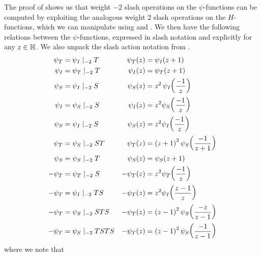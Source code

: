 The proof of  shows us that weight $-2$ slash operations on the $\psi$-functions can be computed by exploiting the analogous weight $2$ slash operations on the $H$-functions, which we can manipulate using  and . We then have the following relations between the $\psi$-functions, expressed in slash notation and explicitly for any $z \in \mathbb{H}$. We also unpack the slash action notation from .
\begin{align}
    \psi_T &= \psi_I \mid_{-2} T &
    \psi_T(z) &= \psi_I\of{z + 1}
    \label{Ch4:Eq:psi_T_eq_psi_I_add_one}
    \\
    \psi_I &= \psi_T \mid_{-2} T &
    \psi_I(z) &= \psi_T\of{z + 1}
    \label{Ch4:Eq:psi_I_eq_psi_T_add_one}
    \\
    \psi_S &= \psi_I \mid_{-2} S &
    \psi_S(z) &= z^2 \, \psi_I\of{\frac{-1}{z}}
    \label{Ch4:Eq:psi_S_eq_zsq_mul_psi_I_neg_inv}
    \\
    \psi_I &= \psi_S \mid_{-2} S &
    \psi_I(z) &= z^2 \psi_S\of{\frac{-1}{z}}
    \label{Ch4:Eq:psi_I_to_psi_S}
    \\
    \psi_S &= \psi_I \mid_{-2} S &
    \psi_S(z) &= z^2 \psi_I\of{\frac{-1}{z}}
    \label{Ch4:Eq:psi_S_to_psi_I}
    \\
    \psi_T &= \psi_S \mid_{-2} ST &
    \psi_T(z) &= \parenth{z+1}^2 \psi_S\of{\frac{-1}{z+1}}
    \label{Ch4:Eq:psi_T_to_psi_S_add}
    \\
    \psi_{S} &= \psi_S \mid_{-2} T &
    \psi_S(z) &= \psi_S(z + 1)
    \label{Ch4:Eq:psi_S_one_periodic}
    \\
    - \psi_{T} &= \psi_T \mid_{-2} S &
    - \psi_T(z) &= z^2 \psi_T\of{\frac{-1}{z}} \label{Ch4:Eq:psi_T_eq_zsq_mul_psi_T_neg_inv}
    \\
    - \psi_{T} &= \psi_I \mid_{-2} TS &
    - \psi_T(z) &= z^2 \psi_I\of{\frac{z - 1}{z}}
    \label{Ch4:Eq:psi_T_eq_neg_psi_I_slash_TS}
    \\
    - \psi_{T} &= \psi_S \mid_{-2} STS &
    - \psi_T(z) &= \parenth{z - 1}^2 \psi_S\of{\frac{-z}{z - 1}}
    \label{Ch4:Eq:psi_T_eq_neg_psi_S_slash_STS}
    \\
    - \psi_{T} &= \psi_S \mid_{-2} TSTS &
    - \psi_T(z) &= \parenth{z - 1}^2 \psi_S\of{\frac{-1}{z - 1}}
    \label{Ch4:Eq:psi_T_as_psi_S_for_J3_J4}
\end{align}
where we note that
